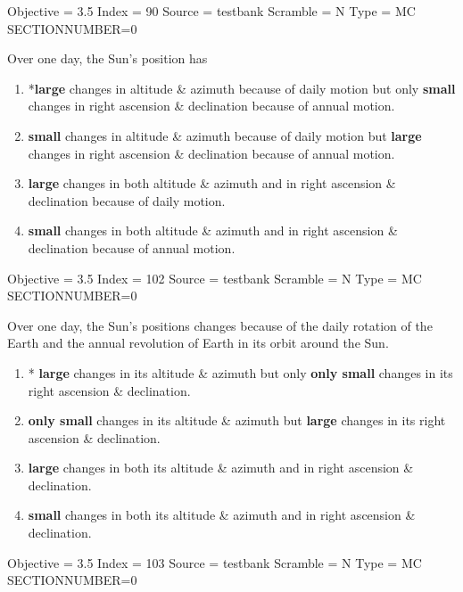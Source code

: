 \documentclass[11pt]{article}
\begin{document}
\begin{enumerate}
\begin{minipage}{\textwidth}
\begin{minipage}{\textwidth}
Objective = 3.5
Index = 90
Source = testbank
Scramble = N
Type = MC
SECTIONNUMBER=0
\end{minipage}
\end{minipage}
\vskip 0.20in

\begin{minipage}{\textwidth}
\begin{minipage}{\textwidth}
\item Over one day, the Sun's position has
\begin{enumerate} 
\setlength{\itemsep}{1pt} 
\setlength{\parskip}{0pt} 
\setlength{\parsep}{0pt}
\setlength{\multicolsep}{1pt} 
\item *{\bf large} changes in altitude \& azimuth because of daily motion but only {\bf small} changes in right ascension \& declination because of annual motion.
\item {\bf small} changes in  altitude \& azimuth because of daily motion  but {\bf large} changes in  right ascension \& declination because of annual motion.
\item {\bf large} changes in both  altitude \& azimuth and in right ascension \& declination because of daily motion.
\item {\bf small} changes in both  altitude \& azimuth and in right ascension \& declination because of annual motion.
\end{enumerate} 
Objective = 3.5
Index = 102
Source = testbank
Scramble = N
Type = MC
SECTIONNUMBER=0
\end{minipage}
\end{minipage}
\vskip 0.20in

\begin{minipage}{\textwidth}
\begin{minipage}{\textwidth}
\item Over one day, the Sun's positions changes because of the daily rotation of the Earth and the annual revolution of Earth in its orbit around the Sun.
\begin{enumerate} 
\setlength{\itemsep}{1pt} 
\setlength{\parskip}{0pt} 
\setlength{\parsep}{0pt}
\setlength{\multicolsep}{1pt} 
\item * {\bf large} changes in its altitude \& azimuth but only {\bf only small} changes in its right ascension \& declination.
\item  {\bf only small} changes in  its altitude \& azimuth but {\bf large} changes in its right ascension \& declination.
\item  {\bf large} changes in both its altitude \& azimuth and in right ascension \& declination.
\item {\bf small} changes in both  its altitude \& azimuth and in right ascension \& declination.
\end{enumerate} 
Objective = 3.5
Index = 103
Source = testbank
Scramble = N
Type = MC
SECTIONNUMBER=0
\end{minipage}
\end{minipage}
\vskip 0.20in


\end{enumerate}
\end{document}

